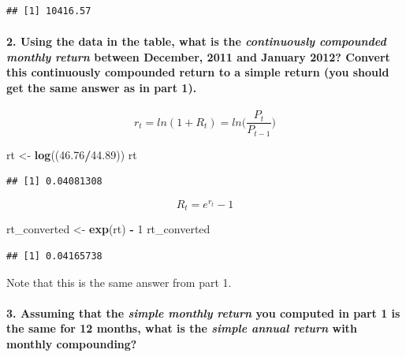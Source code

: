 \documentclass[]{article}
\newenvironment{Shaded}{\begin{snugshade}}{\end{snugshade}}
\newcommand{\KeywordTok}[1]{\textcolor[rgb]{0.13,0.29,0.53}{\textbf{#1}}}
\newcommand{\DecValTok}[1]{\textcolor[rgb]{0.00,0.00,0.81}{#1}}
\newcommand{\FloatTok}[1]{\textcolor[rgb]{0.00,0.00,0.81}{#1}}
\newcommand{\StringTok}[1]{\textcolor[rgb]{0.31,0.60,0.02}{#1}}
\newcommand{\OperatorTok}[1]{\textcolor[rgb]{0.81,0.36,0.00}{\textbf{#1}}}
\newcommand{\NormalTok}[1]{#1}
\let\oldparagraph\paragraph
\renewcommand{\paragraph}[1]{\oldparagraph{#1}\mbox{}}
\begin{document}
\begin{verbatim}
## [1] 10416.57
\end{verbatim}

\paragraph{\texorpdfstring{2. Using the data in the table, what is the
\emph{continuously compounded monthly return} between December, 2011 and
January 2012? Convert this continuously compounded return to a simple
return (you should get the same answer as in part
1).}{2. Using the data in the table, what is the continuously compounded monthly return between December, 2011 and January 2012? Convert this continuously compounded return to a simple return (you should get the same answer as in part 1).}}\label{using-the-data-in-the-table-what-is-the-continuously-compounded-monthly-return-between-december-2011-and-january-2012-convert-this-continuously-compounded-return-to-a-simple-return-you-should-get-the-same-answer-as-in-part-1.}

\[r_t = ln(1+R_t) = ln\Big(\frac{P_t}{P_{t-1}}\Big)\]

\begin{Shaded}
\begin{Highlighting}[]
\NormalTok{rt <-}\StringTok{ }\KeywordTok{log}\NormalTok{((}\FloatTok{46.76}\OperatorTok{/}\FloatTok{44.89}\NormalTok{))}
\NormalTok{rt}
\end{Highlighting}
\end{Shaded}

\begin{verbatim}
## [1] 0.04081308
\end{verbatim}

\[R_t = e^{r_t} - 1\]

\begin{Shaded}
\begin{Highlighting}[]
\NormalTok{rt_converted <-}\StringTok{ }\KeywordTok{exp}\NormalTok{(rt) }\OperatorTok{-}\StringTok{ }\DecValTok{1}
\NormalTok{rt_converted}
\end{Highlighting}
\end{Shaded}

\begin{verbatim}
## [1] 0.04165738
\end{verbatim}

Note that this is the same answer from part 1.

\paragraph{\texorpdfstring{3. Assuming that the \emph{simple monthly
return} you computed in part 1 is the same for 12 months, what is the
\emph{simple annual return} with monthly
compounding?}{3. Assuming that the simple monthly return you computed in part 1 is the same for 12 months, what is the simple annual return with monthly compounding?}}\label{assuming-that-the-simple-monthly-return-you-computed-in-part-1-is-the-same-for-12-months-what-is-the-simple-annual-return-with-monthly-compounding}
\end{document}
